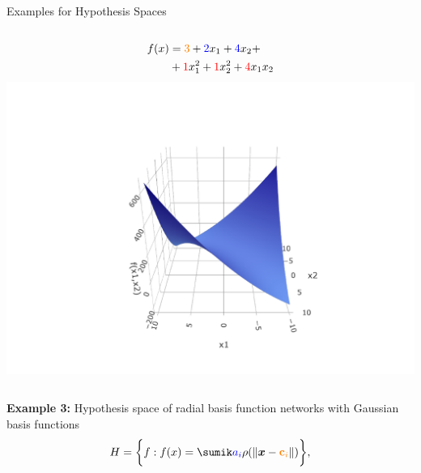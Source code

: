 \documentclass[11pt,compress,t,notes=noshow, xcolor=table]{beamer}
\begin{document}
\begin{vbframe}{Examples for Hypothesis Spaces}
\begin{columns}
  \begin{column}{0.33\textwidth}
    \begin{center}
      \begin{equation*}
        \begin{split}
          f(x) &= \textcolor{orange}{3} + \textcolor{blue}{2} x_1 + 
          \textcolor{blue}{4} x_2 + \\
          &+ \textcolor{red}{1} x_1^2 + \textcolor{red}{1} x_2^2 
          + \textcolor{red}{4} x_1 x_2
        \end{split}
      \end{equation*}
      \includegraphics[width=1.2\textwidth]{figure/hs-quadric-3.pdf}
    \end{center}
  \end{column}

  \normalsize
  
\end{columns}

\framebreak

\textbf{Example 3:} Hypothesis space of radial basis function networks with
Gaussian basis functions
$$\Hspace = \bigg\{ f: \fx =  \sumik \textcolor{blue}{a_i} \rho ( \| \xv - 
\textcolor{orange}{\textbf{c}_i}  \|) 
\bigg\},$$ 


\end{vbframe}
\end{document}
